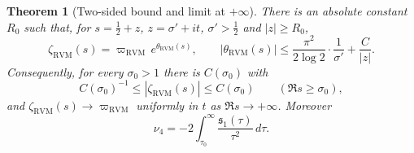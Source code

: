 \documentclass[11pt,reqno]{amsart}
\numberwithin{equation}{section}
\theoremstyle{plain}
\newtheorem{theorem}{Theorem}[section]
\theoremstyle{definition}
\theoremstyle{remark}
\newcommand{\RVM}{\mathrm{RVM}}
\begin{document}
\begin{theorem}[Two-sided bound and limit at $+\infty$]\label{thm:halfplane-RVM}
There is an absolute constant $R_0$ such that, for $s=\tfrac12+z$, $z=\sigma'+it$, $\sigma'>\tfrac12$ and $|z|\ge R_0$,
\begin{equation}\label{eq:halfplane-RVM}
 \zeta_{\RVM}(s)=\varpi_{\RVM}\,e^{\theta_{\RVM}(s)},\qquad |\theta_{\RVM}(s)|\le\frac{\pi^2}{2\log2}\cdot\frac1{\sigma'}+\frac{C}{|z|}.
\end{equation}
Consequently, for every $\sigma_0>1$ there is $C(\sigma_0)$ with
\begin{equation}\label{eq:halfplane-two-sided}
 C(\sigma_0)^{-1}\le|\zeta_{\RVM}(s)|\le C(\sigma_0)\qquad(\Re s\ge\sigma_0),
\end{equation}
and $\zeta_{\RVM}(s)\to\varpi_{\RVM}$ uniformly in $t$ as $\Re s\to+\infty$.  Moreover
\begin{equation}\label{eq:nu4-closed}
 \nu_4=-2\int_{\tau_0}^\infty\frac{\mathfrak s_1(\tau)}{\tau^2}\,d\tau .
\end{equation}
\end{theorem}
\end{document}
